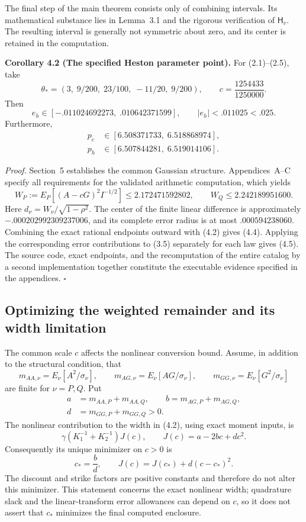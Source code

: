 The final step of the main theorem consists only of combining intervals. Its mathematical substance lies in Lemma~3.1 and the rigorous verification of \(\mathsf H_v\). The resulting interval is generally not symmetric about zero, and its center is retained in the computation.


\textbf{Corollary 4.2 (The specified Heston parameter point).}
For (2.1)--(2.5), take
\[
\theta_*=(3,\;9/200,\;23/100,\;-11/20,\;9/200),\qquad
c=\frac{1254433}{1250000}.
\tag{4.3}
\]
Then
\[
e_h\in[-.011024692273,\;.010642371599],\qquad |e_h|<.011025<.025.
\tag{4.4}
\]
Furthermore,
\[
\begin{aligned}
p_c&\in[6.508371733,\;6.518868974],\\
p_h&\in[6.507844281,\;6.519014106].
\end{aligned}
\tag{4.5}
\]

\textit{Proof.} Section~5 establishes the common Gaussian structure. Appendices~A--C specify all requirements for the validated arithmetic computation, which yields
\[
W_P:=E_P[(A-cG)^2I^{-1/2}]\le2.172471592802,\qquad
W_Q\le2.242189951600.
\tag{4.6}
\]
Here \(d_\nu=W_\nu/\sqrt{1-\rho^2}\). The center of the finite linear difference is approximately
\(-.000202992309237006\), and its complete error radius is at most
\(.000594238060\). Combining the exact rational endpoints outward with (4.2) gives (4.4).
Applying the corresponding error contributions to (3.5) separately for each law gives (4.5). The source code, exact endpoints, and the recomputation of the entire catalog by a second implementation together constitute the executable evidence specified in the appendices. \hfill\(\square\)

\subsection{Optimizing the weighted remainder and its width limitation}

The common scale \(c\) affects the nonlinear conversion bound. Assume, in
addition to the structural condition, that
\[
m_{AA,\nu}=E_\nu[A^2/\sigma_\nu],\qquad
m_{AG,\nu}=E_\nu[AG/\sigma_\nu],\qquad
m_{GG,\nu}=E_\nu[G^2/\sigma_\nu]
\]
are finite for \(\nu=P,Q\). Put
\[
\begin{aligned}
a&=m_{AA,P}+m_{AA,Q},\qquad b=m_{AG,P}+m_{AG,Q},\\
d&=m_{GG,P}+m_{GG,Q}>0.
\end{aligned}
\]
The nonlinear contribution to the
width in (4.2), using exact moment inputs, is
\[
\gamma\left(K_1^{-1}+K_2^{-1}\right)J(c),\qquad
J(c)=a-2bc+dc^2.
\]
Consequently its unique minimizer on \(c>0\) is
\[
c_* = \frac{b}{d},\qquad
J(c)=J(c_*)+d(c-c_*)^2.                         \tag{4.7}
\]
The discount and strike factors are positive constants and therefore do not
alter this minimizer. This statement concerns the exact nonlinear width;
quadrature slack and the linear-transform error allowances can depend on \(c\), so
it does not assert that \(c_*\) minimizes the final computed enclosure.

